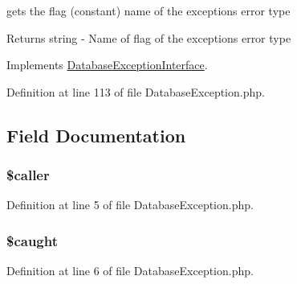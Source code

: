 gets the flag (constant) name of the exception\textquotesingle{}s error type

\begin{DoxyReturn}{Returns}
string -\/ Name of flag of the exception\textquotesingle{}s error type 
\end{DoxyReturn}


Implements \hyperlink{interface_database_exception_interface_aaf4fb3a4978596f9e37fdbdd1e786082}{Database\+Exception\+Interface}.



Definition at line 113 of file Database\+Exception.\+php.



\subsection{Field Documentation}
\hypertarget{class_database_exception_a0b21046130eb880a92ca750675597c75}{}
\subsubsection[{\$caller}]{\setlength{\rightskip}{0pt plus 5cm}\$caller\hspace{0.3cm}{\ttfamily [protected]}}\label{class_database_exception_a0b21046130eb880a92ca750675597c75}


Definition at line 5 of file Database\+Exception.\+php.

\hypertarget{class_database_exception_a461278c71fc5038037fac5e2f5e1c6af}{}
\subsubsection[{\$caught}]{\setlength{\rightskip}{0pt plus 5cm}\$caught\hspace{0.3cm}{\ttfamily [protected]}}\label{class_database_exception_a461278c71fc5038037fac5e2f5e1c6af}


Definition at line 6 of file Database\+Exception.\+php.

\hypertarget{class_database_exception_a078837d5b35b669c158aa3cc2c0e2a9f}{}
